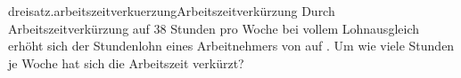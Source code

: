 \begin{exercise}{dreisatz.arbeitszeitverkuerzung}{Arbeitszeitverkürzung}
  \ifproblem\problem
    Durch Arbeitszeitverkürzung auf 38 Stunden pro Woche bei vollem Lohnausgleich
    erhöht sich der Stundenlohn eines Arbeitnehmers von  auf .
    Um wie viele Stunden je Woche hat sich die Arbeitszeit verkürzt?
  \fi
\end{exercise}
